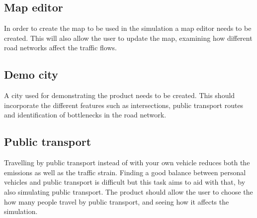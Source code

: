\subsection{Map editor}
    In order to create the map to be used in the simulation a map editor needs to be created. This will also allow the user to update the map, examining how different road networks affect the traffic flows.

\subsection{Demo city}
    A city used for demonstrating the product needs to be created. This should incorporate the different features such as intersections, public transport routes and identification of bottlenecks in the road network.

\subsection{Public transport}
    Travelling by public transport instead of with your own vehicle reduces both the emissions as well as the traffic strain. Finding a good balance between personal vehicles and public transport is difficult but this task aims to aid with that, by also simulating public transport. The product should allow the user to choose the how many people travel by public transport, and seeing how it affects the simulation.